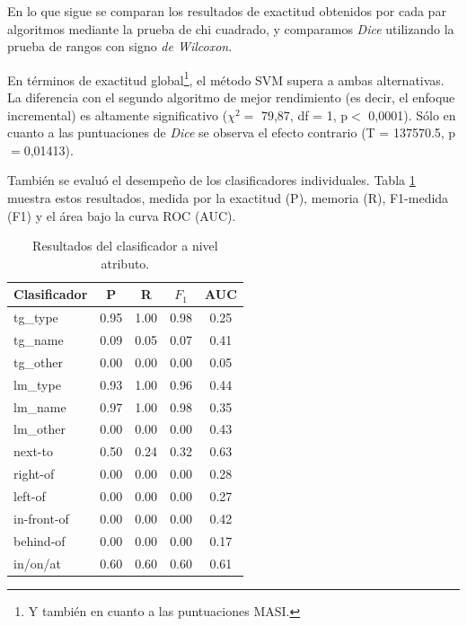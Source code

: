 

En lo que sigue se comparan los resultados de exactitud obtenidos por cada par algoritmos mediante la prueba de chi cuadrado, y comparamos {\em Dice} utilizando la prueba de rangos con signo {\em de Wilcoxon}.

En t\'erminos de exactitud global\footnote{Y tambi\'en en cuanto a las puntuaciones MASI.}, el m\'etodo SVM supera a ambas alternativas. La diferencia con el segundo algoritmo de mejor rendimiento (es decir, el enfoque incremental) es altamente significativo ($\chi^{2}=$ 79,87, df = 1, p$<$ 0,0001). S\'olo en cuanto a las puntuaciones de {\it Dice} se observa el efecto contrario (T = 137570.5, p$=$0,01413).

Tambi\'en se evalu\'o el desempe\~no de los clasificadores individuales. Tabla \ref{tab-svm-results} muestra estos resultados, medida por la exactitud (P), memoria (R), F1-medida (F1) y el \'area bajo la curva ROC (AUC).

\begin{table}[H]
\begin{center}
\footnotesize{

\begin{tabular}{l c c c c }
\hline
{{Clasificador}}	& {P} & {R} & {$F_{1}$} & {AUC} \\
\hline
{{tg\_type}} 			& 0.95 & 1.00 & 0.98 & 0.25 \\
{{tg\_name}}			& 0.09 & 0.05 & 0.07 & 0.41 \\
{{tg\_other}}			& 0.00 & 0.00 & 0.00 & 0.05 \\                               
{{lm\_type}}			& 0.93 & 1.00 & 0.96 & 0.44 \\                               
{{lm\_name}}			& 0.97 & 1.00 & 0.98 & 0.35 \\                               
{{lm\_other}}			& 0.00 & 0.00 & 0.00 & 0.43 \\                               
{{next-to}}				& 0.50 & 0.24 & 0.32 & 0.63 \\                               
{{right-of}}			& 0.00 & 0.00 & 0.00 & 0.28 \\                               
{{left-of}}				& 0.00 & 0.00 & 0.00 & 0.27 \\                               
{{in-front-of}}		& 0.00 & 0.00 & 0.00 & 0.42 \\                               
{{behind-of}}			& 0.00 & 0.00 & 0.00 & 0.17 \\                               
{{in/on/at}} 			& 0.60 & 0.60 & 0.60 & 0.61 \\                               
\hline                   
\end{tabular}
\caption{Resultados del clasificador a nivel atributo.}
\label{tab-svm-results}
}
\end{center}
\end{table}
\normalsize

